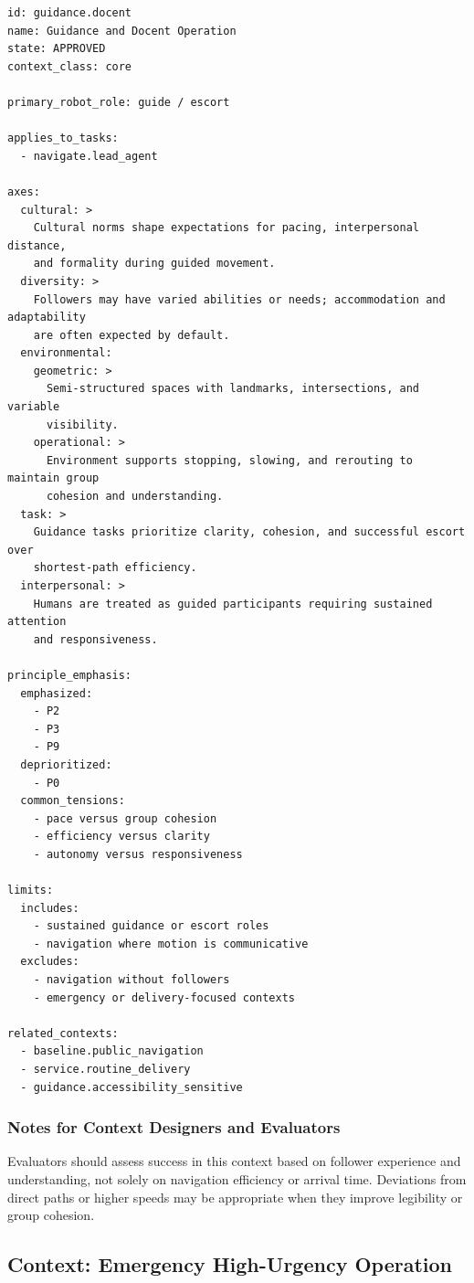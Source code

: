 \documentclass[utf8]{frontiers_suppmat} %
\begin{document}
\begin{lstlisting}[style=literatecard]
id: guidance.docent
name: Guidance and Docent Operation
state: APPROVED
context_class: core

primary_robot_role: guide / escort

applies_to_tasks:
  - navigate.lead_agent

axes:
  cultural: >
    Cultural norms shape expectations for pacing, interpersonal distance,
    and formality during guided movement.
  diversity: >
    Followers may have varied abilities or needs; accommodation and adaptability
    are often expected by default.
  environmental:
    geometric: >
      Semi-structured spaces with landmarks, intersections, and variable
      visibility.
    operational: >
      Environment supports stopping, slowing, and rerouting to maintain group
      cohesion and understanding.
  task: >
    Guidance tasks prioritize clarity, cohesion, and successful escort over
    shortest-path efficiency.
  interpersonal: >
    Humans are treated as guided participants requiring sustained attention
    and responsiveness.

principle_emphasis:
  emphasized:
    - P2
    - P3
    - P9
  deprioritized:
    - P0
  common_tensions:
    - pace versus group cohesion
    - efficiency versus clarity
    - autonomy versus responsiveness

limits:
  includes:
    - sustained guidance or escort roles
    - navigation where motion is communicative
  excludes:
    - navigation without followers
    - emergency or delivery-focused contexts

related_contexts:
  - baseline.public_navigation
  - service.routine_delivery
  - guidance.accessibility_sensitive
\end{lstlisting}

\subsubsection{Notes for Context Designers and
Evaluators}\label{notes-for-context-designers-and-evaluators}

Evaluators should assess success in this context based on follower
experience and understanding, not solely on navigation efficiency or
arrival time. Deviations from direct paths or higher speeds may be
appropriate when they improve legibility or group cohesion.


\subsection{Context: Emergency High-Urgency
Operation}\label{context-emergency-high-urgency-operation}
\end{document}
